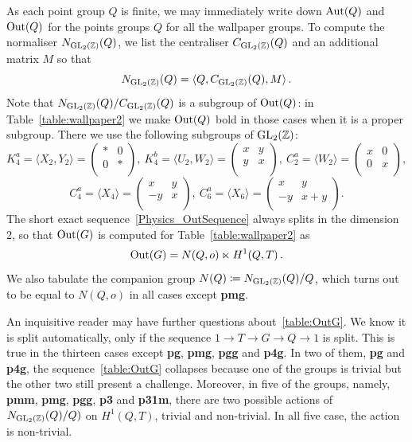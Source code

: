 As each point group $Q$ is finite, we may immediately write down $\operatorname{Aut}(Q)$ and $\operatorname{Out} (Q)$ for the points groups $Q$ for all the wallpaper groups.
To compute the normaliser $N_{\operatorname{GL}_2 ({\mathbb Z}) }(Q)$, we list the centraliser $C_{\operatorname{GL}_2 ({\mathbb Z}) }(Q)$ and an additional matrix $M$ so that
\[ N_{\operatorname{GL}_2 ({\mathbb Z}) }(Q) = \langle Q, C_{\operatorname{GL}_2 ({\mathbb Z}) }(Q), M \rangle \, .\]
Note that  $N_{\operatorname{GL}_2 ({\mathbb Z}) }(Q) / C_{\operatorname{GL}_2 ({\mathbb Z}) }(Q)$ is a subgroup of $\operatorname{Out} (Q)$:
in Table~\ref{table:wallpaper2} we make $\operatorname{Out} (Q)$ bold in those cases when it is a proper subgroup.
There we use the following subgroups of $\operatorname{GL}_2 ({\mathbb Z})$:
\[
K^a_4 = \langle X_2,Y_2\rangle = \begin{pmatrix} \ast & 0 \\ 0 & \ast \\ \end{pmatrix}, \
K^b_4 = \langle U_2,W_2\rangle = \begin{pmatrix} x & y \\ y & x \\ \end{pmatrix}, \
C^a_2=\langle W_2\rangle = \begin{pmatrix} x & 0 \\ 0 & x \\ \end{pmatrix},
\]
\[
C^a_4=\langle X_4\rangle = \begin{pmatrix} x & y \\ -y & x \\ \end{pmatrix}, \
C^a_6 = \langle X_6\rangle = \begin{pmatrix} x & y \\ -y & x+y \\ \end{pmatrix}.
\]
The short exact sequence~\eqref{Physics_OutSequence} always splits in the dimension 2,
 so that $\operatorname{Out} (G)$ is computed for Table~\ref{table:wallpaper2} as
\begin{equation} \label{table:OutG}
\operatorname{Out} (G) = N(Q,o) \ltimes H^1(Q,T) \, .
\end{equation}
We also tabulate the companion group
$N (Q) \coloneqq N_{\operatorname{GL}_2 ({\mathbb Z}) }(Q)/Q$,
which turns out to be equal to $N(Q,o)$ in all cases except {\bfseries pmg}.

An inquisitive reader may have further questions about~\eqref{table:OutG}.
We know it is split automatically, only if the sequence $1 \to T \to G \to Q \to 1$ is split. 
This is true in the thirteen cases except
{\bfseries pg},
{\bfseries pmg},
{\bfseries pgg}
and
{\bfseries p4g}.
In two of them, 
{\bfseries pg}
and
{\bfseries p4g},
the sequence~\eqref{table:OutG} collapses because one of the groups is trivial
but the other two still present a challenge.
Moreover, in five of the groups, namely,
{\bfseries pmm},
{\bfseries pmg},
{\bfseries pgg},
{\bfseries p3}
and
{\bfseries p31m},
there are two possible actions of
$N_{\operatorname{GL}_2 ({\mathbb Z}) }(Q)/Q)$ on  $H^1(Q,T)$, trivial and non-trivial.
In all five case, the action is non-trivial.

